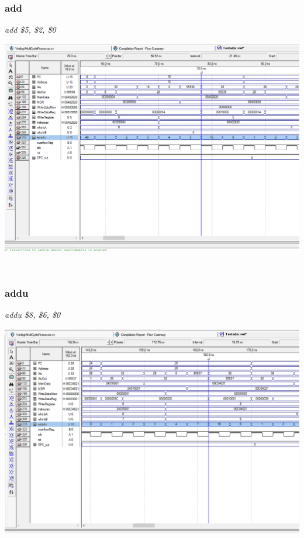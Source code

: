 \documentclass{article}
\begin{document}
    \subsubsection{add}
    {\it add \$5, \$2, \$0}\\
    \begin{center}
        \includegraphics[scale=0.25]{add.PNG}
    \end{center}
    
    \\
    \subsubsection{addu}
    {\it addu \$8, \$6, \$0}\\
    \begin{center}
        \includegraphics[scale=0.25]{addu.PNG}
    \end{center}
    
\end{document}
